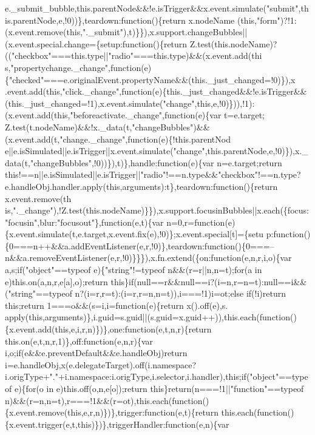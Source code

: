 \begin{DoxyCode}
{       e.\_submit\_bubble,this.parentNode&&!e.isTrigger&&x.event.simulate("submit",this.parentNode,e,!0))\},teardown:function()\{return
       x.nodeName
      (this,"form")?!1:(x.event.remove(this,".\_submit"),t)\}\}),x.support.changeBubbles||(x.event.special.change=\{setup:function()\{return
       Z.test(this.nodeName)?(("checkbox"===this.type||"radio"===this.type)&&(x.event.add(thi
      s,"propertychange.\_change",function(e)\{"checked"===e.originalEvent.propertyName&&(this.\_just\_changed=!0)\}),x
      .event.add(this,"click.\_change",function(e)\{this.\_just\_changed&&!e.isTrigger&&(this.\_just\_changed=!1),x.event.simulate("change",this,e,!0)\})),!1):(x.event.add(this,"beforeactivate.\_change",function(e)\{var
       t=e.target;
      Z.test(t.nodeName)&&!x.\_data(t,"changeBubbles")&&(x.event.add(t,"change.\_change",function(e)\{!this.parentNod
      e||e.isSimulated||e.isTrigger||x.event.simulate("change",this.parentNode,e,!0)\}),x.\_data(t,"changeBubbles",!0))\}),t)\},handle:function(e)\{var n=e.target;return
       this!==n||e.isSimulated||e.isTrigger||"radio"!==n.type&&"checkbox"!==n.type?e.handleObj.handler.apply(this,arguments):t\},teardown:function()\{return
       x.event.remove(th
      is,".\_change"),!Z.test(this.nodeName)\}\}),x.support.focusinBubbles||x.each(\{focus:"focusin",blur:"focusout"\},function(e,t)\{var
       n=0,r=function(e)\{x.event.simulate(t,e.target,x.event.fix(e),!0)\};x.event.special[t]=\{setu
      p:function()\{0===n++&&a.addEventListener(e,r,!0)\},teardown:function()\{0===--n&&a.removeEventListener(e,r,!0)\}\}\}),x.fn.extend(\{on:function(e,n,r,i,o)\{var a,s;if("object"==typeof e)\{"string"!=typeof
       n&&(r=r||n,n=t);for(a in e)this.on(a,n,r,e[a],o);return this\}if(null==r&&null==i?(i=n,r=n=t):null==i&&("string"==typeof
       n?(i=r,r=t):(i=r,r=n,n=t)),i===!1)i=ot;else if(!i)return this;return 1===o&&(s=i,i=function(e)\{return
       x().off(e),s.
      apply(this,arguments)\},i.guid=s.guid||(s.guid=x.guid++)),this.each(function()\{x.event.add(this,e,i,r,n)\})\},one:function(e,t,n,r)\{return this.on(e,t,n,r,1)\},off:function(e,n,r)\{var
       i,o;if(e&&e.preventDefault&&e.handleObj)return
       i=e.handleObj,x(e.delegateTarget).off(i.namespace?i.origType+"."+i.namespace:i.origType,i.selector,i.handler),this;if("object"==typeof e)\{for(o in e)this.off(o,n,e[o]);return
       this\}return(n===!1||"function"==typeof
       n)&&(r=n,n=t),r===!1&&(r=ot),this.each(function()\{x.event.remove(this,e,r,n)\})\},trigger:function(e,t)\{return this.each(function()\{x.event.trigger(e,t,this)\})\},triggerHandler:function(e,n)\{var
}
\end{DoxyCode}
